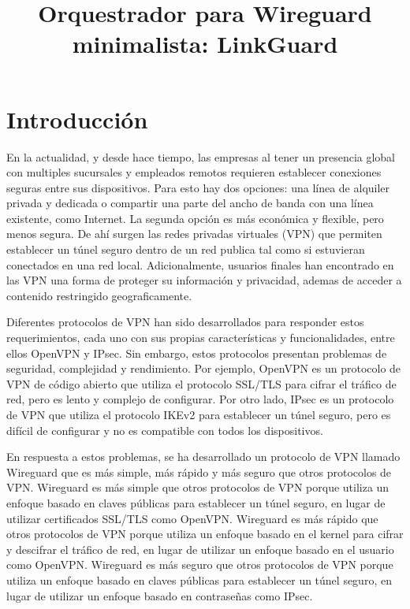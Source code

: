 \documentclass{article}
\title{Orquestrador para Wireguard minimalista: LinkGuard}
\begin{document}
\maketitle


\section{Introducción}

En la actualidad, y desde hace tiempo, las empresas al tener un presencia global con multiples sucursales y empleados remotos requieren establecer conexiones seguras entre sus dispositivos. Para esto hay dos opciones: una línea de alquiler privada y dedicada o compartir una parte del ancho de banda con una línea existente, como Internet. La segunda opción es más económica y flexible, pero menos segura. De ahí surgen las redes privadas virtuales (VPN) que permiten establecer un túnel seguro dentro de un red publica tal como si estuvieran conectados en una red local. Adicionalmente, usuarios finales han encontrado en las VPN una forma de proteger su información y privacidad, ademas de acceder a contenido restringido geograficamente.

Diferentes protocolos de VPN han sido desarrollados para responder estos requerimientos, cada uno con sus propias características y funcionalidades, entre ellos OpenVPN y IPsec. Sin embargo, estos protocolos presentan problemas de seguridad, complejidad y rendimiento. Por ejemplo, OpenVPN es un protocolo de VPN de código abierto que utiliza el protocolo SSL/TLS para cifrar el tráfico de red, pero es lento y complejo de configurar. Por otro lado, IPsec es un protocolo de VPN que utiliza el protocolo IKEv2 para establecer un túnel seguro, pero es difícil de configurar y no es compatible con todos los dispositivos.

En respuesta a estos problemas, se ha desarrollado un protocolo de VPN llamado Wireguard que es más simple, más rápido y más seguro que otros protocolos de VPN. Wireguard es más simple que otros protocolos de VPN porque utiliza un enfoque basado en claves públicas para establecer un túnel seguro, en lugar de utilizar certificados SSL/TLS como OpenVPN. Wireguard es más rápido que otros protocolos de VPN porque utiliza un enfoque basado en el kernel para cifrar y descifrar el tráfico de red, en lugar de utilizar un enfoque basado en el usuario como OpenVPN. Wireguard es más seguro que otros protocolos de VPN porque utiliza un enfoque basado en claves públicas para establecer un túnel seguro, en lugar de utilizar un enfoque basado en contraseñas como IPsec.
\end{document}

